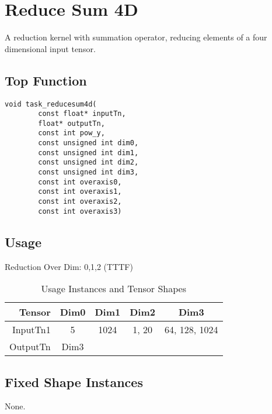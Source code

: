 \pagebreak






\section{Reduce Sum 4D}
A reduction kernel with summation operator, reducing elements of a four dimensional input tensor.
\subsection{Top Function}
\begin{lstlisting}
void task_reducesum4d(
        const float* inputTn,
        float* outputTn,
        const int pow_y,
        const unsigned int dim0,
        const unsigned int dim1,
        const unsigned int dim2,
        const unsigned int dim3,
        const int overaxis0,
        const int overaxis1,
        const int overaxis2,
        const int overaxis3)
\end{lstlisting}

\subsection{Usage}
Reduction Over Dim: 0,1,2 (TTTF)
\vspace{0.5cm}
\begin{table}[htbp] %
\caption{Usage Instances and Tensor Shapes}
\label{tab:shapes_concat}
	\begin{center}
		\begin{tabular}{|r|c|c|c|c|} 
		\hline	
		Tensor & Dim0 & Dim1 & Dim2 & Dim3\\ 
		\hline	
		InputTn1 &
			5 &
			1024 &
			1, 20 &
			64, 128, 1024 \\ 
		\hline
		OutputTn &
			Dim3 & 
			 & 
			 & 
			 \\
		\hline
		\end{tabular}
	\end{center}
\end{table}

\subsection{Fixed Shape Instances}
None.

